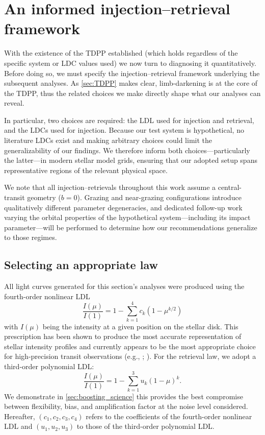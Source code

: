 \documentclass[twocolumn]{aastex631}
\newcommand{\vtwo}[1]{{#1}}
\begin{document}
\section{An informed injection--retrieval framework}\label{sec:framework}
With the existence of the TDPP established (which holds regardless of the specific system or LDC values used) we now turn to diagnosing it quantitatively. Before doing so, we must specify the injection--retrieval framework underlying the subsequent analyses. As \autoref{sec:TDPP} makes clear, limb-darkening is at the core of the TDPP, thus the related choices we make directly shape what our analyses can reveal.

In particular, two choices are required: the LDL used for injection and retrieval, and the LDCs used for injection. Because our test system is hypothetical, no literature LDCs exist and making arbitrary choices could limit the generalizability of our findings. We therefore \vtwo{inform} both choices---particularly the latter---in modern stellar model grids, ensuring that our adopted setup spans representative regions of the relevant physical space.

We note that all injection--retrievals throughout this work assume a central-transit geometry ($b=0$). Grazing and near-grazing configurations introduce qualitatively different parameter degeneracies, and dedicated follow-up work varying the orbital properties of the hypothetical system---including its impact parameter---will be performed to determine how our recommendations generalize to those regimes.

\subsection{Selecting an appropriate law}\label{sec:appropriate_law}
All light curves generated for this section's analyses were produced using the fourth-order nonlinear LDL
\begin{equation}
    \frac{I(\mu)}{I(1)} = 1 - \sum_{k=1}^{4} c_k(1-\mu^{k/2})
\end{equation}
with $I(\mu)$ being the intensity at a given position on the stellar disk. This prescription has been shown to produce the most accurate representation of stellar intensity profiles and currently appears to be the most appropriate choice for high-precision transit observations (e.g., ; \citealt{Morello2017, Keers2024}). For the retrieval law, we adopt a third-order polynomial LDL:
%
\begin{equation}
    \frac{I(\mu)}{I(1)} = 1 - \sum_{k=1}^{3} u_k(1-\mu)^k.
\end{equation}
%
We demonstrate in \autoref{sec:boosting_science} this provides the best compromise between flexibility, bias, and amplification factor at the noise level considered. Hereafter, $(c_1, c_2, c_3, c_4)$ refers to the coefficients of the fourth-order nonlinear LDL and $(u_1, u_2, u_3)$ to those of the third-order polynomial LDL.
\end{document}
